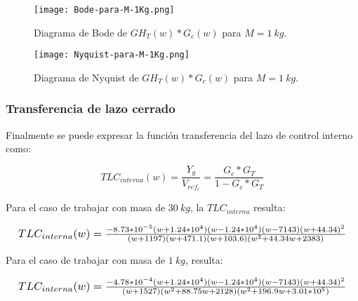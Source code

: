 \begin{figure}[H]
	\centering
	\texttt{[image: Bode-para-M-1Kg.png]}
	\caption{Diagrama de Bode de $GH_T(w)*G_c(w)$ para $M=1\:kg$.}
	\label{fig:bode-para-M-1Kg}
\end{figure}

\begin{figure}[H]
	\centering
	\texttt{[image: Nyquist-para-M-1Kg.png]}
	\caption{Diagrama de Nyquist de $GH_T(w)*G_c(w)$ para $M=1\:kg$.}
	\label{fig:nyquist-para-M-1Kg}
\end{figure}

\subsubsection{Transferencia de lazo cerrado}

Finalmente se puede expresar la función transferencia del lazo de control interno como:
%


\begin{equation}
	TLC_{interna}(w)=\frac{Y_g}{V_{ref_c}}=\frac{G_c*G_T}{1-G_c*G_T}
\end{equation}

Para el caso de trabajar con masa de $30\:kg$, la $TLC_{interna}$ resulta:
%

\begin{equation*}
	\resizebox{.99\hsize}{!}
	{
		$
		TLC_{interna}(w)=\frac{-8.73*10^{-5} (w+1.24*10^4) (w-1.24*10^4) (w-7143) (w+44.34)^2}{(w+1197) (w+471.1) (w+103.6) (w^2 + 44.34w + 2383)}
		$
	}
\end{equation*}


Para el caso de trabajar con masa de $1\:kg$, resulta:


\begin{equation*}
	\resizebox{.99\hsize}{!}
	{
		$
		TLC_{interna}(w)=\frac{-4.78*10^{-4} (w+1.24*10^4) (w-1.24*10^4) (w-7143) (w+44.34)^2}{(w+1527) (w^2 + 88.75w + 2128) (w^2 + 196.9w + 3.01*10^5)}	
		$
	}
\end{equation*}



